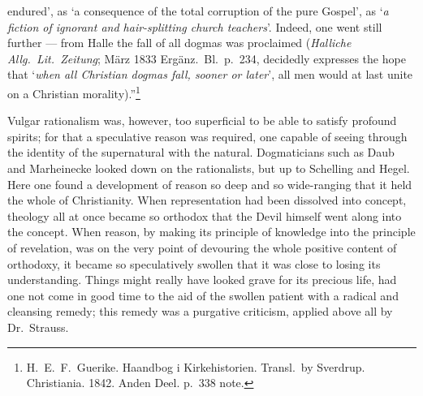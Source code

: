 \documentclass[12pt,a4paper]{article}
\newcommand{\opage}[1]{\marginnote{\footnotesize\textit{[#1]}}}
\begin{document}
\opage{31}endured', as `a consequence of the total corruption of the pure Gospel', as
`\emph{a fiction of ignorant and hair-splitting church teachers}'. Indeed,
one went still further --- from Halle the fall of all dogmas was proclaimed
(\textit{Halliche Allg.\ Lit.\ Zeitung}; März 1833 Ergänz.\ Bl.\ p.\ 234,
decidedly expresses the hope that `\emph{when all Christian dogmas fall,
sooner or later}', all men would at last unite on a Christian
morality).''\footnote{H.\ E.\ F.\ Guerike. Haandbog i Kirkehistorien. Transl.\ by Sverdrup.
Christiania. 1842. Anden Deel. p.\ 338 note.} %

Vulgar rationalism was, however, too superficial to be able to satisfy
profound spirits; for that a speculative reason was required, one capable of
seeing through the identity of the supernatural with the natural.
Dogmaticians such as Daub and Marheinecke looked down on the rationalists,
but up to Schelling and Hegel. Here one found a development of reason so
deep and so wide-ranging that it held the whole of Christianity. When
representation had been dissolved into concept, theology all at once became
so orthodox that the Devil himself went along into the concept. When reason,
by making its principle of knowledge into the principle of revelation, was
on the very point of devouring the whole positive content of orthodoxy, it
became so speculatively swollen that it was close to losing its
understanding. Things might really have looked grave for its precious life,
had one not come in good time to the aid of the swollen patient with a
radical and cleansing remedy; this remedy was a purgative criticism, applied
above all by Dr.\ Strauss.
\end{document}
